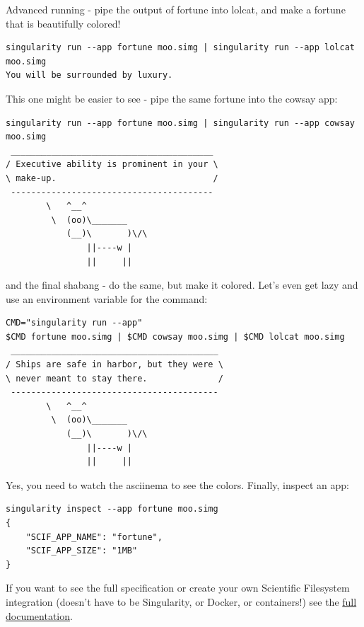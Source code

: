 \documentclass[a4paper]{article}
\begin{document}
Advanced running - pipe the output of fortune into lolcat, and make a fortune that is beautifully colored!\\[0.1in]

\begin{lstlisting}[frame=single]
singularity run --app fortune moo.simg | singularity run --app lolcat moo.simg
You will be surrounded by luxury.  
\end{lstlisting}

This one might be easier to see - pipe the same fortune into the cowsay app:

\begin{lstlisting}[frame=single]  
singularity run --app fortune moo.simg | singularity run --app cowsay moo.simg
 ________________________________________
/ Executive ability is prominent in your \
\ make-up.                               /
 ----------------------------------------
        \   ^__^
         \  (oo)\_______
            (__)\       )\/\
                ||----w |
                ||     ||
\end{lstlisting}

        and the final shabang - do the same, but make it colored. Let’s even get lazy and use an environment variable for the command:
        
\begin{lstlisting}[frame=single]
CMD="singularity run --app"
$CMD fortune moo.simg | $CMD cowsay moo.simg | $CMD lolcat moo.simg
 _________________________________________
/ Ships are safe in harbor, but they were \
\ never meant to stay there.              /
 -----------------------------------------
        \   ^__^
         \  (oo)\_______
            (__)\       )\/\
                ||----w |
                ||     ||
\end{lstlisting}      
      
 Yes, you need to watch the asciinema to see the colors. Finally, inspect an app:
 
\begin{lstlisting}[frame=single] 
singularity inspect --app fortune moo.simg 
{
    "SCIF_APP_NAME": "fortune",
    "SCIF_APP_SIZE": "1MB"
} 
\end{lstlisting} 

If you want to see the full specification or create your own Scientific Filesystem integration (doesn’t have to be Singularity, or Docker, or containers!) see the \href{https://sci-f.github.io/}{full documentation}.\\[0.1in]
\end{document}
